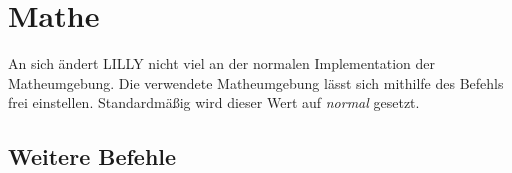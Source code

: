 \chapter[Mathe \LILLYxBOXxVersion{\small 1.0.0}]{Mathe}
\smallskip\renewcommand{\arraystretch}{1.5}
\reversemarginpar\par
An sich ändert LILLY nicht viel an der normalen Implementation der Matheumgebung. Die verwendete Matheumgebung lässt sich mithilfe des Befehls  frei einstellen. Standardmäßig wird dieser Wert auf \emph{normal} gesetzt.

\section{Weitere Befehle}

